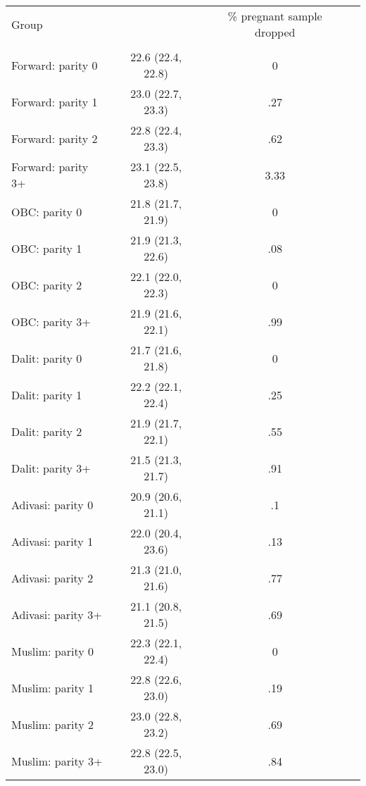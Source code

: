 \begin{tabular}{lccc}
\toprule
Group &  & \% pregnant sample dropped \\\\
\midrule
Forward: parity 0&22.6 (22.4, 22.8)&0\\
Forward: parity 1&23.0 (22.7, 23.3)&.27\\
Forward: parity 2&22.8 (22.4, 23.3)&.62\\
Forward: parity 3+&23.1 (22.5, 23.8)&3.33\\
OBC: parity 0&21.8 (21.7, 21.9)&0\\
OBC: parity 1&21.9 (21.3, 22.6)&.08\\
OBC: parity 2&22.1 (22.0, 22.3)&0\\
OBC: parity 3+&21.9 (21.6, 22.1)&.99\\
Dalit: parity 0&21.7 (21.6, 21.8)&0\\
Dalit: parity 1&22.2 (22.1, 22.4)&.25\\
Dalit: parity 2&21.9 (21.7, 22.1)&.55\\
Dalit: parity 3+&21.5 (21.3, 21.7)&.91\\
Adivasi: parity 0&20.9 (20.6, 21.1)&.1\\
Adivasi: parity 1&22.0 (20.4, 23.6)&.13\\
Adivasi: parity 2&21.3 (21.0, 21.6)&.77\\
Adivasi: parity 3+&21.1 (20.8, 21.5)&.69\\
Muslim: parity 0&22.3 (22.1, 22.4)&0\\
Muslim: parity 1&22.8 (22.6, 23.0)&.19\\
Muslim: parity 2&23.0 (22.8, 23.2)&.69\\
Muslim: parity 3+&22.8 (22.5, 23.0)&.84\\
\bottomrule
\end{tabular}
